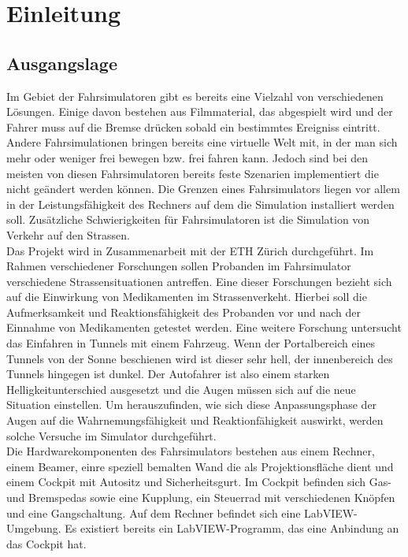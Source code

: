 \section{Einleitung}
\subsection{Ausgangslage}

Im Gebiet der Fahrsimulatoren gibt es bereits eine Vielzahl von verschiedenen Lösungen. Einige davon bestehen aus Filmmaterial, das abgespielt wird und der Fahrer muss auf die Bremse drücken sobald ein bestimmtes Ereigniss eintritt. Andere Fahrsimulationen bringen bereits eine virtuelle Welt mit, in der man sich mehr oder weniger frei bewegen bzw. frei fahren kann. Jedoch sind bei den meisten von diesen Fahrsimulatoren bereits feste Szenarien implementiert die  nicht geändert werden können. Die Grenzen eines Fahrsimulators liegen vor allem in der Leistungsfähigkeit des Rechners auf dem die Simulation installiert werden soll. Zusätzliche Schwierigkeiten für Fahrsimulatoren ist die Simulation von Verkehr auf den Strassen. \\
Das Projekt wird in Zusammenarbeit mit der ETH Zürich durchgeführt. Im Rahmen verschiedener Forschungen sollen Probanden im Fahrsimulator verschiedene Strassensituationen antreffen. Eine dieser Forschungen bezieht sich auf die Einwirkung von Medikamenten im Strassenverkeht. Hierbei soll die Aufmerksamkeit und Reaktionsfähigkeit des Probanden vor und nach der Einnahme von Medikamenten getestet werden. Eine weitere Forschung untersucht das Einfahren in Tunnels mit einem Fahrzeug. Wenn der Portalbereich eines Tunnels von der Sonne beschienen wird ist dieser sehr hell, der innenbereich des Tunnels hingegen ist dunkel. Der Autofahrer ist also einem starken Helligkeitunterschied ausgesetzt und die Augen müssen sich auf die neue Situation einstellen. Um herauszufinden, wie sich diese Anpassungsphase der Augen auf die Wahrnemungsfähigkeit und Reaktionfähigkeit auswirkt, werden solche Versuche im Simulator durchgeführt. \\
Die Hardwarekomponenten des Fahrsimulators bestehen aus einem Rechner, einem Beamer, einre speziell bemalten Wand die als Projektionsfläche dient und einem Cockpit mit Autositz und Sicherheitsgurt. Im Cockpit befinden sich Gas- und Bremspedas sowie eine Kupplung, ein Steuerrad mit verschiedenen Knöpfen und eine Gangschaltung. Auf dem Rechner befindet sich eine LabVIEW-Umgebung. Es existiert bereits ein LabVIEW-Programm, das eine Anbindung an das Cockpit hat.

